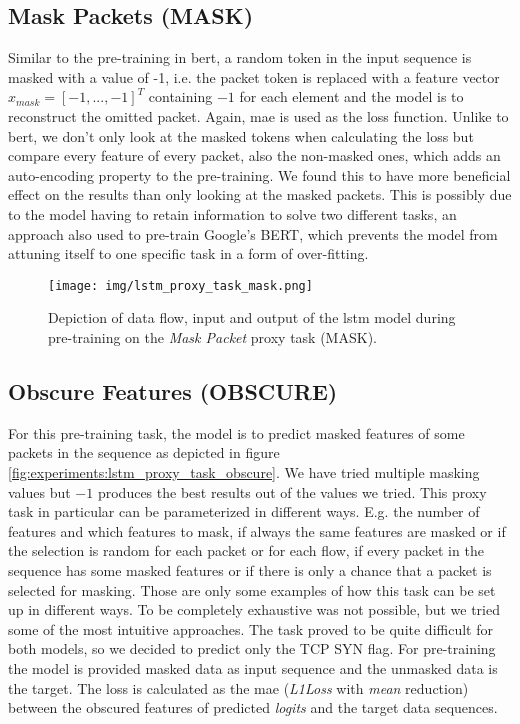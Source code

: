 \subsection{Mask Packets (MASK)} \label{sec:experiments:lstm:mask_packet}

Similar to the pre-training in \gls{bert}, a random token in the input sequence is masked with a value of -1, i.e. the packet token is replaced with a feature vector $x_{mask} = [-1, ..., -1]^T$ containing $-1$ for each element and the model is to reconstruct the omitted packet. Again, \gls{mae} is used as the loss function. Unlike to \gls{bert}, we don't only look at the masked tokens when calculating the loss but compare every feature of every packet, also the non-masked ones, which adds an auto-encoding property to the pre-training. We found this to have more beneficial effect on the results than only looking at the masked packets. This is possibly due to the model having to retain information to solve two different tasks, an approach also used to pre-train Google's BERT,  which prevents the model from attuning itself to one specific task in a form of over-fitting.

\begin{figure}[]
	\centering
	\texttt{[image: img/lstm\_proxy\_task\_mask.png]}
	\caption{Depiction of data flow, input and output of the \gls{lstm} model during pre-training on the \textit{Mask Packet} proxy task (MASK). }
	\label{fig:experiments:lstm_proxy_task_mask}
\end{figure}

\subsection{Obscure Features (OBSCURE)} \label{sec:experiments:lstm:obscure}

For this pre-training task, the model is to predict masked features of some packets in the sequence as depicted in figure \ref{fig:experiments:lstm_proxy_task_obscure}. We have tried multiple masking values but $-1$ produces the best results out of the values we tried. This proxy task in particular can be parameterized in different ways. E.g. the number of features and which features to mask, if always the same features are masked or if the selection is random for each packet or for each flow, if every packet in the sequence has some masked features or if there is only a chance that a packet is selected for masking. Those are only some examples of how this task can be set up in different ways. To be completely exhaustive was not possible, but we tried some of the most intuitive approaches. The task proved to be quite difficult for both models, so we decided to predict only the TCP SYN flag. For pre-training the model is provided masked data as input sequence and the unmasked data is the target. The loss is calculated as the \gls{mae} (\textit{L1Loss} with \textit{mean} reduction) between the obscured features of predicted \textit{logits} and the target data sequences.

